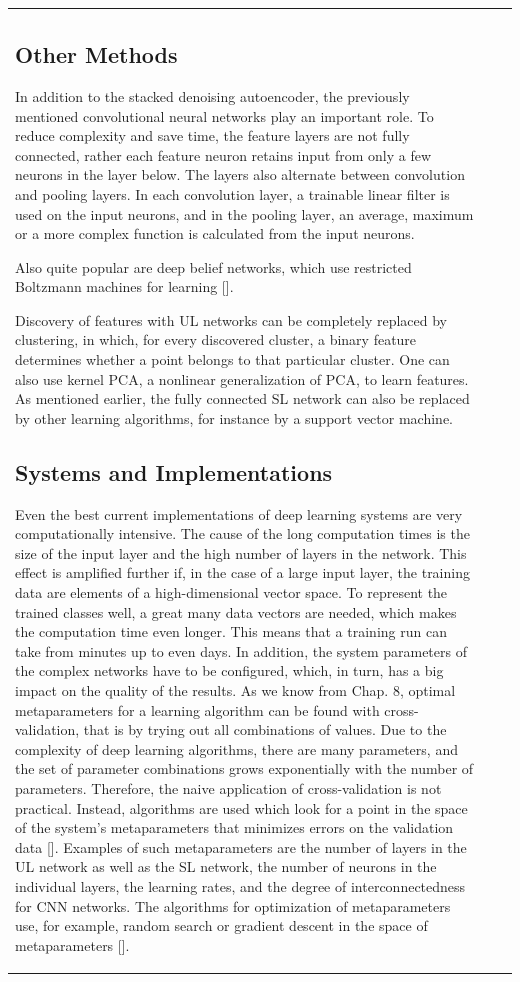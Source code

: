 \documentclass[10pt]{book}
\begin{document}
\begin{center}
\begin{tabular}{|l|l|l|}
\subsection{Other Methods}
In addition to the stacked denoising autoencoder, the previously mentioned convolutional neural networks play an important role. To reduce complexity and save time, the feature layers are not fully connected, rather each feature neuron retains input from only a few neurons in the layer below. The layers also alternate between convolution and pooling layers. In each convolution layer, a trainable linear filter is used on the input neurons, and in the pooling layer, an average, maximum or a more complex function is calculated from the input neurons.

Also quite popular are deep belief networks, which use restricted Boltzmann machines for learning [\cite{hot06}].

Discovery of features with UL networks can be completely replaced by clustering, in which, for every discovered cluster, a binary feature determines whether a point belongs to that particular cluster. One can also use kernel PCA, a nonlinear generalization of PCA, to learn features. As mentioned earlier, the fully connected SL network can also be replaced by other learning algorithms, for instance by a support vector machine.

\subsection{Systems and Implementations}
Even the best current implementations of deep learning systems are very computationally intensive. The cause of the long computation times is the size of the input layer and the high number of layers in the network. This effect is amplified further if, in the case of a large input layer, the training data are elements of a high-dimensional vector space. To represent the trained classes well, a great many data vectors are needed, which makes the computation time even longer.
This means that a training run can take from minutes up to even days. In addition, the system parameters of the complex networks have to be configured, which, in turn, has a big impact on the quality of the results. As we know from Chap. 8, optimal metaparameters for a learning algorithm can be found with cross-validation, that is by trying out all combinations of values. Due to the complexity of deep learning algorithms, there are many parameters, and the set of parameter combinations grows exponentially with the number of parameters. Therefore, the naive application of cross-validation is not practical. Instead, algorithms are used which look for a point in the space of the system's metaparameters that minimizes errors on the validation data [\cite{bbbk11}]. Examples of such metaparameters are the number of layers in the UL network as well as the SL network, the number of neurons in the individual layers, the learning rates, and the degree of interconnectedness for CNN networks. The algorithms for optimization of metaparameters use, for example, random search or gradient descent in the space of metaparameters [\cite{mda15}].


\end{tabular}
\end{center}
\end{document}
